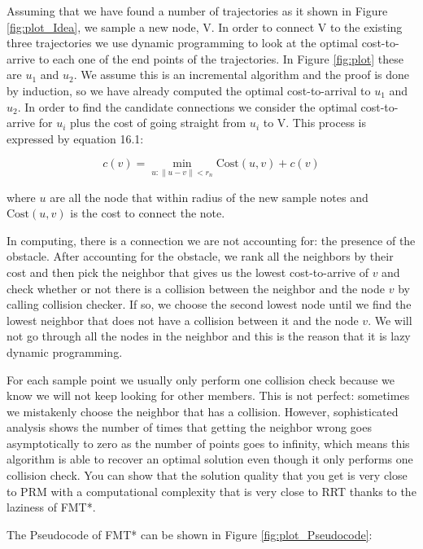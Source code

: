 \documentclass[twoside]{article}
\begin{document}
Assuming that we have found a number of trajectories as it shown in Figure \ref{fig:plot_Idea}, we sample a new node, V. In order to connect V to the existing three trajectories we use dynamic programming to look at the optimal cost-to-arrive to each one of the end points of the trajectories. In Figure \ref{fig:plot} these are $u_1$ and $u_2$. We assume this is an incremental algorithm and the proof is done by induction,  so we have already computed the optimal cost-to-arrival to $u_1$ and $u_2$. In order to find the candidate connections we consider the optimal cost-to-arrive for $u_i$ plus the cost of going straight from $u_i$ to V. This process is expressed by equation 16.1:

\begin{equation}
    c(v) = \min_{u:\|u - v\| < r_n} \text{Cost}(u, v) + c(v)
\end{equation}

where $u$ are all the node that within radius of the new sample notes and $\text{Cost}(u, v)$ is the cost to connect the note.

In computing, there is a connection we are not accounting for: the presence of the obstacle. After accounting for the obstacle, we rank all the neighbors by their cost and then pick the neighbor that gives us the lowest cost-to-arrive of $v$ and check whether or not there is a collision between the neighbor and the node $v$ by calling collision checker. If so, we choose the second lowest node until we find the lowest neighbor that does not have a collision between it and the node $v$. We will not go through all the nodes in the neighbor and this is the reason that it is lazy dynamic programming.

For each sample point we usually only perform one collision check because we know we will not keep looking for other members. This is not perfect: sometimes we mistakenly choose the neighbor that has a collision. However, sophisticated analysis shows the number of times that getting the neighbor wrong goes asymptotically to zero as the number of points goes to infinity, which means this algorithm is able to recover an optimal solution even though it only performs one collision check. You can show that the solution quality that you get is very close to PRM with a computational complexity that is very close to RRT thanks to the laziness of FMT*.

The Pseudocode of FMT* can be shown in Figure \ref{fig:plot_Pseudocode}:
\end{document}
